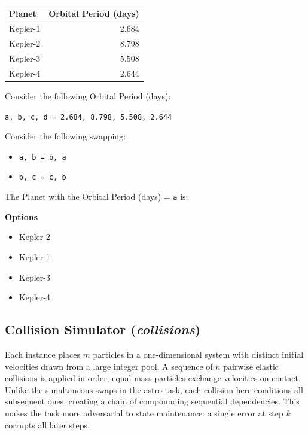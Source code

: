 \documentclass[11pt]{article}
\theoremstyle{definition}
\begin{document}
\begin{tcolorbox}[colback=gray!5!white, colframe=gray!75!black, title=Example Prompt, breakable]
\small
\begin{tabular}{@{}l r@{}}
\textbf{Planet} & \textbf{Orbital Period (days)} \\ \hline
Kepler-1 & 2.684 \\
Kepler-2 & 8.798 \\
Kepler-3 & 5.508 \\
Kepler-4 & 2.644 \\
\end{tabular}

\vspace{6pt}
Consider the following Orbital Period (days):
\begin{center}
\texttt{a, b, c, d = 2.684, 8.798, 5.508, 2.644}
\end{center}

Consider the following swapping:
\begin{itemize}
\item \texttt{a, b = b, a}
\item \texttt{b, c = c, b}
\end{itemize}

The Planet with the Orbital Period (days) = \texttt{a} is:

\textbf{Options}
\begin{itemize}
\item[A)] Kepler-2
\item[B)] Kepler-1
\item[C)] Kepler-3
\item[D)] Kepler-4
\end{itemize}
\end{tcolorbox}

\subsection{Collision Simulator (\textit{collisions})}

Each instance places $m$ particles in a one-dimensional system with distinct initial velocities drawn from a large integer pool. A sequence of $n$ pairwise elastic collisions is applied in order; equal-mass particles exchange velocities on contact. Unlike the simultaneous swaps in the astro task, each collision here conditions all subsequent ones, creating a chain of compounding sequential dependencies. This makes the task more adversarial to state maintenance: a single error at step $k$ corrupts all later steps.
\end{document}
